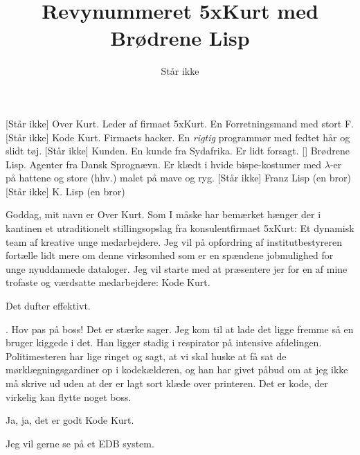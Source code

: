 \documentclass[a4paper,11pt]{article}
\title{Revynummeret 5xKurt med Brødrene Lisp}
\author{Står ikke}
\begin{document}
\maketitle

\begin{roles}
[Står ikke] Over Kurt. Leder af firmaet 5xKurt. En Forretningsmand med
stort F.
[Står ikke] Kode Kurt. Firmaets hacker. En \emph{rigtig} programmør med
fedtet hår og slidt tøj.
[Står ikke] Kunden. En kunde fra Sydafrika. Er lidt forsagt.
[] Brødrene Lisp. Agenter fra Dansk Sprognævn. Er klædt i hvide
bispe-kostumer med $\lambda$-er på hattene og store (hhv.) malet på mave og ryg.
[Står ikke] Franz Lisp (en bror)
[Står ikke] K. Lisp (en bror)
\end{roles}


\begin{sketch}


 Goddag, mit navn er Over Kurt. Som I måske har bemærket hænger der i
kantinen et utraditionelt stillingsopslag fra konsulentfirmaet 5xKurt: Et
dynamisk team af kreative unge medarbejdere. Jeg vil på opfordring af
institutbestyreren fortælle lidt mere om denne virksomhed som er en spændene
jobmulighed for unge nyuddannede dataloger. Jeg vil starte med at præsentere jer
for en af mine trofaste og værdsatte medarbejdere: Kode Kurt.


 Det dufter effektivt.

 . Hov pas på boss! Det er stærke
sager. Jeg kom til at lade det ligge fremme så en bruger kiggede i det. Han
ligger stadig i respirator på intensive afdelingen. Politimesteren har lige
ringet og sagt, at vi skal huske at få sat de mørklægningsgardiner op i
kodekælderen, og han har givet påbud om at jeg ikke må skrive ud uden at der er
lagt sort klæde over printeren. Det er kode, der virkelig kan flytte noget boss.

 Ja, ja, det er godt Kode Kurt.


 Jeg vil gerne se på et EDB system.


\end{sketch}
\end{document}
